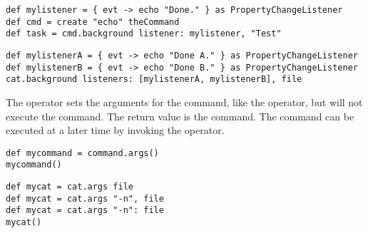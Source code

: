 \begin{lstlisting}[style=Groovybash, label={lst:example_background2}, 
title={Inform when the command finishes in the background.}]
def mylistener = { evt -> echo "Done." } as PropertyChangeListener
def cmd = create "echo" theCommand
def task = cmd.background listener: mylistener, "Test"
\end{lstlisting}

\begin{lstlisting}[style=Groovybash, label={lst:example_background2}, 
title={Inform the listeners when the command finishes in the background.}]
def mylistenerA = { evt -> echo "Done A." } as PropertyChangeListener
def mylistenerB = { evt -> echo "Done B." } as PropertyChangeListener
cat.background listeners: [mylistenerA, mylistenerB], file
\end{lstlisting}

%

The  operator sets the arguments for the command, like 
the  operator, but will not execute the command. The return
value is the command. The command can be executed at a later time by invoking
the  operator.

\begin{lstlisting}[style=Groovybash, label={lst:example_args1}, title={Store 
the command in a variable with no arguments given.}]
def mycommand = command.args()
mycommand()
\end{lstlisting}

\begin{lstlisting}[style=Groovybash, label={lst:example_args2}, title={Store 
the command in a variable with arguments given either direct or by key=value 
pairs.}]
def mycat = cat.args file
def mycat = cat.args "-n", file
def mycat = cat.args "-n": file
mycat()
\end{lstlisting}

